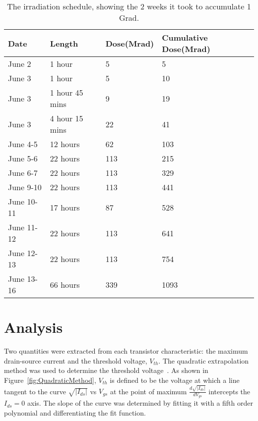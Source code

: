 \begin{table}
\begin{center}
\caption{The irradiation schedule, showing the 2 weeks it took to accumulate 1 Grad.}
\begin{tabular}{| p{2cm} | p{2.5cm} | p{2cm} | p{4cm} |}
\hline
Date & Length & Dose(Mrad) & Cumulative Dose(Mrad)\\ \hline
June 2 & 1 hour & 5 & 5\\ \hline
June 3 & 1 hour & 5 & 10 \\ \hline
June 3 & 1 hour 45 mins & 9 & 19 \\ \hline
June 3 & 4 hour 15 mins & 22 & 41 \\ \hline
June 4-5 & 12 hours & 62 & 103 \\ \hline
June 5-6 & 22 hours & 113 & 215 \\ \hline
June 6-7 & 22 hours & 113 & 329 \\ \hline
June 9-10 & 22 hours & 113 & 441 \\ \hline
June 10-11 & 17 hours & 87 & 528 \\ \hline
June 11-12 & 22 hours & 113 & 641 \\ \hline
June 12-13 & 22 hours & 113 & 754 \\ \hline
June 13-16 & 66 hours & 339 & 1093 \\
\hline
\end{tabular}
\label{tab:IrradiationSchedule}
\end{center}
\end{table}


\section{Analysis}

Two quantities were extracted from each transistor characteristic: the maximum drain-source current and the threshold voltage, $V_{th}$. The quadratic extrapolation method was used to determine the threshold voltage~\cite{QuadraticMethod}. As shown in Figure~\ref{fig:QuadraticMethod}, $V_{th}$ is defined to be the voltage at which a line tangent to the curve $\sqrt{|I_{ds}|}$ vs $V_{gs}$ at the point of maximum $\frac{d \sqrt{|I_{ds}|}}{dV_{gs}}$ intercepts the $I_{ds}=0$ axis. The slope of the curve was determined by fitting it with a fifth order polynomial and differentiating the fit function. 

